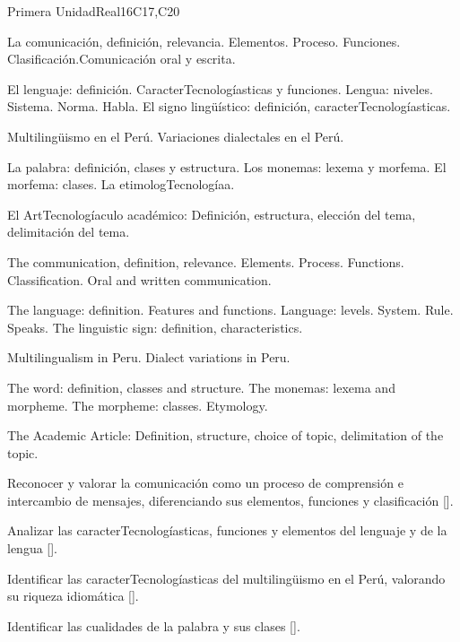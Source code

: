 \begin{syllabus}
\begin{competences}
    \item {}
\end{competences}

\begin{unit}{}{Primera Unidad}{Real}{16}{C17,C20}
\begin{topics}
      \item La comunicación, definición, relevancia. Elementos. Proceso. Funciones. Clasificación.Comunicación oral y escrita.
      \item El lenguaje: definición. CaracterTecnologíasticas y funciones. Lengua: niveles. Sistema. Norma. Habla. El signo lingüístico: definición, caracterTecnologíasticas.
      \item Multilingüismo en el Perú. Variaciones dialectales en el Perú.
      \item La palabra: definición, clases y estructura. Los monemas: lexema y morfema. El morfema: clases. La etimologTecnologíaa.
      \item El ArtTecnologíaculo académico: Definición, estructura, elección del tema, delimitación del tema.

      \item The communication, definition, relevance. Elements. Process. Functions. Classification. Oral and written communication.
      \item The language: definition. Features and functions. Language: levels. System. Rule. Speaks. The linguistic sign: definition, characteristics.
      \item Multilingualism in Peru. Dialect variations in Peru.
      \item The word: definition, classes and structure. The monemas: lexema and morpheme. The morpheme: classes. Etymology.
      \item The Academic Article: Definition, structure, choice of topic, delimitation of the topic.
\end{topics}

\begin{learningoutcomes}
   \item Reconocer y valorar la comunicación como un proceso de comprensión e intercambio de mensajes, diferenciando sus elementos, funciones y clasificación [\Usage].
   \item Analizar las caracterTecnologíasticas, funciones y elementos del lenguaje y de la lengua [\Usage].
   \item Identificar las caracterTecnologíasticas del multilingüismo en el Perú, valorando su riqueza idiomática [\Usage].
   \item Identificar las cualidades de la palabra y sus clases [\Usage].


\end{learningoutcomes}
\end{unit}
\end{syllabus}
